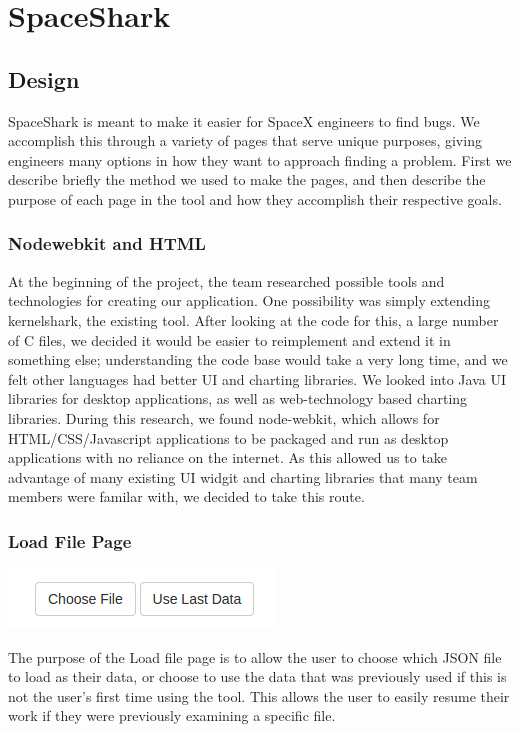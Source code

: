 \documentclass{hmcclinic}
\begin{document}
\chapter{SpaceShark}
\section{Design} %

  SpaceShark is meant to make it easier for SpaceX engineers to find bugs. We
  accomplish this through a variety of pages that serve unique purposes, giving
  engineers many options in how they want to approach finding a problem. First
  we describe briefly the method we used to make the pages, and then describe
  the purpose of each page in the tool and how they accomplish their
  respective goals.

  \subsection{Nodewebkit and HTML} %
    At the beginning of the project, the team researched possible tools and
    technologies for creating our application. One possibility was simply
    extending kernelshark, the existing tool. After looking at the code for
    this, a large number of C files, we decided it would be easier to
    reimplement and extend it in something else; understanding the code base
    would take a very long time, and we felt other languages had better
    UI and charting libraries. We looked into Java UI libraries for
    desktop applications, as well as web-technology based charting libraries.
    During this research, we found node-webkit, which allows for
    HTML/CSS/Javascript applications to be packaged and run as desktop
    applications with no reliance on the internet. As this allowed us to take
    advantage of many existing UI widgit and charting libraries that many team
    members were familar with, we decided to take this route.

\subsection{Load File Page}
\begin{center}
\includegraphics[scale=0.75]{loadFile-buttons.png}
\end{center}
The purpose of the Load file page is to allow the user to choose which JSON file to load as their data, or choose to use the data that was previously used if this is not the user's first time using the tool. This allows the user to easily resume their work if they were previously examining a specific file.
\end{document}

